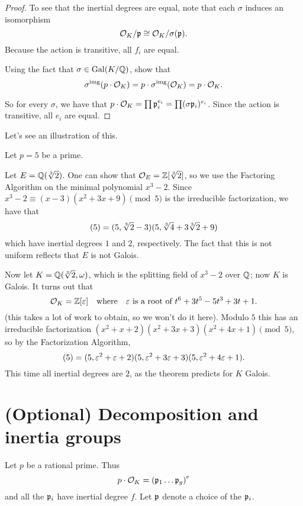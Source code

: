 \begin{proof}
	To see that the inertial degrees are equal, note that each $\sigma$
	induces an isomorphism
	\[ \mathcal O_K / \mathfrak p \cong \mathcal O_K / \sigma(\mathfrak p). \]
	Because the action is transitive, all $f_i$ are equal.
	\begin{exercise}
		Using the fact that $\sigma \in \operatorname{Gal}(K/\mathbb Q)$,
		show that \[ \sigma^{\text{img}}(p \cdot \mathcal O_K) = p \cdot \sigma^{\text{img}}(\mathcal O_K) = p \cdot \mathcal O_K. \]
	\end{exercise}
	So for every $\sigma$, we have that
	$p \cdot \mathcal O_K = \prod \mathfrak p_i^{e_i} = \prod (\sigma\mathfrak p_i)^{e_i}$.
	Since the action is transitive, all $e_i$ are equal.
\end{proof}

Let's see an illustration of this.
\begin{example}
	Let $p = 5$ be a prime.
	\begin{enumerate}[(a)]
		\ii Let $E = \mathbb Q(\sqrt[3]{2})$.
		One can show that $\mathcal O_E = \mathbb Z[\sqrt[3]{2}]$, so
		we use the Factoring Algorithm on the minimal polynomial $x^3-2$.
		Since $x^3-2 \equiv (x-3)(x^2+3x+9) \pmod 5$ is the irreducible factorization,
		we have that
		\[ (5) = (5,\sqrt[3]{2}-3)(5, \sqrt[3]{4}+3\sqrt[3]{2}+9) \]
		which have inertial degrees $1$ and $2$, respectively.
		The fact that this is not uniform reflects that $E$ is not Galois.

		\ii Now let $K = \mathbb Q(\sqrt[3]{2},\omega)$, which is the splitting
		field of $x^3-2$ over $\mathbb Q$; now $K$ is Galois.
		It turns out that
		\[ \mathcal O_K = \mathbb Z[\varepsilon] \quad\text{where}\quad \varepsilon \text { is a root of } t^6+3t^5-5t^3+3t+1. \]
		(this takes a lot of work to obtain, so we won't do it here).
		Modulo $5$ this has an irreducible factorization
		$(x^2+x+2)(x^2+3x+3)(x^2+4x+1) \pmod 5$,
		so by the Factorization Algorithm,
		\[ (5) = (5, \varepsilon^2+\varepsilon+2)(5, \varepsilon^2+3\varepsilon+3)(5, \varepsilon^2+4\varepsilon+1). \]
		This time all inertial degrees are $2$, as the theorem predicts for $K$ Galois.
	\end{enumerate}
\end{example}

\section{(Optional) Decomposition and inertia groups}
Let $p$ be a rational prime.
Thus
\[ p \cdot \mathcal O_K = \left( \mathfrak p_1 \dots \mathfrak p_g \right)^e \]
and all the $\mathfrak p_i$ have inertial degree $f$.
Let $\mathfrak p$ denote a choice of the $\mathfrak p_i$.

